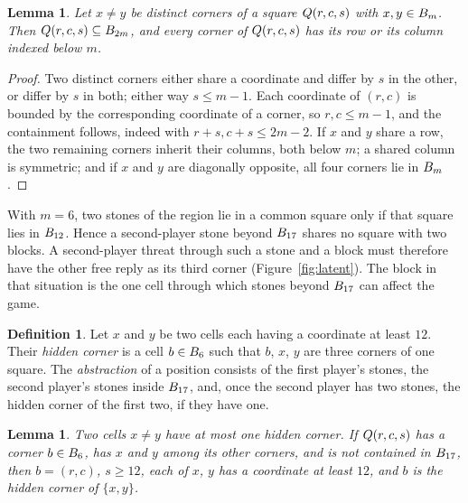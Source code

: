 \documentclass[11pt]{amsart}
\newtheorem{lemma}[theorem]{Lemma}
\theoremstyle{definition}
\newtheorem{definition}[theorem]{Definition}
\theoremstyle{remark}
\begin{document}
\begin{lemma}\label{lem:span}
Let $x \ne y$ be distinct corners of a square $Q(r,c,s)$ with
$x, y \in B_m$. Then $Q(r,c,s) \subseteq B_{2m}$, and every
corner of $Q(r,c,s)$ has its row or its column indexed below $m$.
\end{lemma}

\begin{proof}
Two distinct corners either share a coordinate and differ by $s$ in the
other, or differ by $s$ in both; either way $s \le m - 1$. Each
coordinate of $(r,c)$ is bounded by the corresponding coordinate of a
corner, so $r, c \le m - 1$, and the containment follows, indeed with
$r + s, c + s \le 2m - 2$. If $x$ and $y$ share a row,
the two remaining corners inherit their columns, both below $m$; a
shared column is symmetric; and if $x$ and $y$ are diagonally opposite,
all four corners lie in $B_m$.
\end{proof}

With $m = 6$, two stones of the region lie in a common square only if
that square lies in $B_{12}$. Hence a second-player stone beyond
$B_{17}$ shares no square with two blocks. A second-player threat
through such a stone and a block must therefore have the other free
reply as its third corner (Figure~\ref{fig:latent}). The
block in that situation is the one cell through which stones beyond
$B_{17}$ can affect the game.

\begin{definition}\label{def:latent}
Let $x$ and $y$ be two cells each having a coordinate at least $12$.
Their \emph{hidden corner} is a cell $b \in B_6$ such that
$b$, $x$, $y$ are three corners of one square. The \emph{abstraction}
of a position consists of the first player's stones, the second
player's stones inside $B_{17}$, and, once the second player has
two stones, the hidden corner of the first two, if they have one.
\end{definition}

\begin{lemma}\label{lem:dichotomy}
Two cells $x \ne y$ have at most one hidden corner. If $Q(r,c,s)$ has
a corner $b \in B_6$, has $x$ and $y$ among its other corners, and
is not contained in $B_{17}$, then $b = (r,c)$, $s \ge 12$, each
of $x$, $y$ has a coordinate at least $12$, and $b$ is the hidden
corner of $\{x, y\}$.
\end{lemma}
\end{document}
